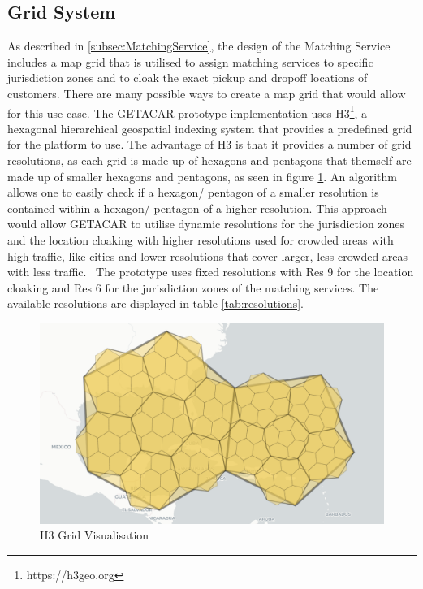 \subsection{Grid System}
As described in \ref{subsec:MatchingService}, the design of the Matching Service includes a map grid that is utilised to assign matching services to specific jurisdiction zones and to cloak the exact pickup and dropoff locations of customers. There are many possible ways to create a map grid that would allow for this use case. The GETACAR prototype implementation uses H3\footnote{https://h3geo.org}, a hexagonal hierarchical geospatial indexing system that provides a predefined grid for the platform to use. The advantage of H3 is that it provides a number of grid resolutions, as each grid is made up of hexagons and pentagons that themself are made up of smaller hexagons and pentagons, as seen in figure \ref{fig:H3Visualisation}. An algorithm allows one to easily check if a hexagon/ pentagon of a smaller resolution is contained within a hexagon/ pentagon of a higher resolution. This approach would allow GETACAR to utilise dynamic resolutions for the  jurisdiction zones and the location cloaking with higher resolutions used for crowded areas with high traffic, like cities and lower resolutions that cover larger, less crowded  areas with less traffic.~\cite{H3Geo.} The prototype uses fixed resolutions with Res 9 for the location cloaking and Res 6 for the  jurisdiction zones of the matching services. The available resolutions are displayed in table \ref{tab:resolutions}.

\begin{figure}[h]
    \centering
    \includegraphics[width=\linewidth]{data/11.png}
    \caption{H3 Grid Visualisation ~\cite{H3Geo.}}
    \label{fig:H3Visualisation}
\end{figure}

